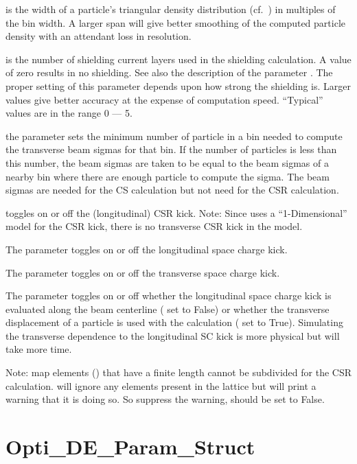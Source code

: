  is the width of a particle's triangular density
distribution (cf.~) in multiples of the bin width. A
larger span will give better smoothing of the computed particle
density with an attendant loss in resolution.

 is the number of shielding current layers used in
the shielding calculation. A value of zero results in no
shielding. See also the description of the parameter
. The proper setting of this parameter depends
upon how strong the shielding is. Larger values give better accuracy
at the expense of computation speed. ``Typical'' values are in the
range 0 --- 5.

the  parameter sets the minimum number of particle in a bin needed to
compute the transverse beam sigmas for that bin. If the number of particles is less than
this number, the beam sigmas are taken to be equal to the beam sigmas of a nearby bin
where there are enough particle to compute the sigma. The beam sigmas are needed for the
CS calculation but not need for the CSR calculation.

 toggles on or off the (longitudinal) CSR kick.  Note: Since \bmad
uses a ``1-Dimensional'' model for the CSR kick, there is no transverse CSR kick in
the model.

The  parameter toggles on or off the longitudinal space charge kick.

The  parameter toggles on or off the transverse space charge kick.

The  parameter toggles on or off whether the longitudinal
space charge kick is evaluated along the beam centerline (
set to False) or whether the transverse displacement of a particle is used with the calculation
( set to True). Simulating the transverse dependence to the
longitudinal SC kick is more physical but will take more time.

Note:  map elements () that have a finite length cannot be
subdivided for the CSR calculation. \bmad will ignore any  elements present in
the lattice but will print a warning that it is doing so. So suppress the warning,
 should be set to False.

\section{Opti_DE_Param_Struct}
\label{s:de.params}

